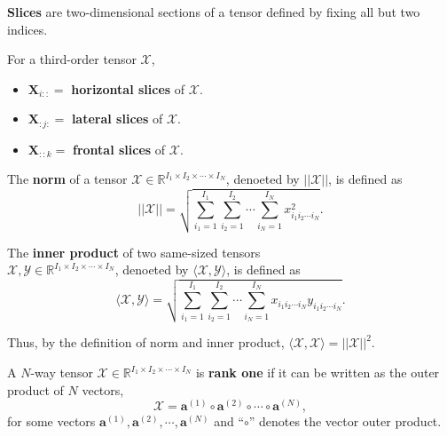 \documentclass[preprint]{elsarticle}
\begin{document}
\begin{defn}
    \textbf{Slices} are two-dimensional sections of a tensor defined by fixing all but two indices.
\end{defn}
For a third-order tensor $\boldsymbol{\mathscr{X}}$,
\begin{itemize}
    \item $\mathbf{X}_{i::}=$ \textbf{horizontal slices} of $\boldsymbol{\mathscr{X}}$.
    \item $\mathbf{X}_{:j:}=$ \textbf{lateral slices} of $\boldsymbol{\mathscr{X}}$.
    \item $\mathbf{X}_{::k}=$ \textbf{frontal slices} of $\boldsymbol{\mathscr{X}}$.
\end{itemize}
\begin{defn}
    The \textbf{norm} of a tensor $\boldsymbol{\mathscr{X}}\in\mathbb{R}^{I_1\times I_2\times\cdots\times I_N}$,
    denoeted by $||\boldsymbol{\mathscr{X}}||$, is defined as
    \begin{equation}
        ||\boldsymbol{\mathscr{X}}||=\sqrt{\sum_{i_1=1}^{I_1}\sum_{i_2=1}^{I_2}\cdots\sum_{i_N=1}^{I_N}x_{i_1i_2\cdots i_N}^2}.
    \end{equation}
\end{defn}
\begin{defn}
    The \textbf{inner product} of two same-sized tensors\\
    $\boldsymbol{\mathscr{X}},\boldsymbol{\mathscr{Y}}\in\mathbb{R}^{I_1\times I_2\times\cdots\times I_N}$,
    denoeted by $\langle\boldsymbol{\mathscr{X}},\boldsymbol{\mathscr{Y}}\rangle$, is defined as
    \begin{equation}
        \langle\boldsymbol{\mathscr{X}},\boldsymbol{\mathscr{Y}}\rangle=\sqrt{\sum_{i_1=1}^{I_1}\sum_{i_2=1}^{I_2}\cdots\sum_{i_N=1}^{I_N}x_{i_1i_2\cdots i_N}y_{i_1i_2\cdots i_N}}.
    \end{equation}
\end{defn}
Thus, by the definition of norm and inner product,
$\langle\boldsymbol{\mathscr{X}},\boldsymbol{\mathscr{X}}\rangle=||\boldsymbol{\mathscr{X}}||^2$.
\begin{defn}
    A $N$-way tensor $\boldsymbol{\mathscr{X}}\in\mathbb{R}^{I_1\times I_2\times\cdots\times I_N}$ is \textbf{rank one} if it can
    be written as the outer product of $N$ vectors,
    \begin{equation}
        \boldsymbol{\mathscr{X}} = \mathbf{a}^{(1)}\circ\mathbf{a}^{(2)}\circ\cdots\circ\mathbf{a}^{(N)},
    \end{equation}
    for some vectors $\mathbf{a}^{(1)},\mathbf{a}^{(2)},\cdots,\mathbf{a}^{(N)}$ and ``$\circ$'' denotes the vector outer product.
\end{defn}
\end{document}
